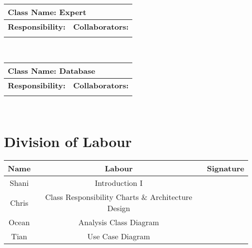 \documentclass[]{article}
\begin{document}
	\begin{table}[ht]
		\centering
		\begin{tabular}{|p{5cm}|p{5cm}|}
		\hline 
		 \multicolumn{2}{|l|}{\textbf{Class Name: Expert}} \\
		\hline
		\textbf{Responsibility:} & \textbf{Collaborators:} \\
		\hline
		\vspace{1in} & \\
		\hline
		\end{tabular}
	\end{table}~\\

	\begin{table}[ht]
		\centering
		\begin{tabular}{|p{5cm}|p{5cm}|}
		\hline 
		 \multicolumn{2}{|l|}{\textbf{Class Name: Database}} \\
		\hline
		\textbf{Responsibility:} & \textbf{Collaborators:} \\
		\hline
		\vspace{1in} & \\
		\hline
		\end{tabular}
	\end{table}~\\

\appendix
\section{Division of Labour}
\label{sec:division_of_labour}
\begin{center}
\begin{tabular}{ |c|c|c| } 
 \hline
 Name & Labour & Signature              \\ \hline
 Shani & Introduction I & \\ 
 Chris & Class Responsibility Charts \& Architecture Design &  \\
 Ocean & Analysis Class Diagram &  \\ 
 Tian & Use Case Diagram & \\ 
 \hline
\end{tabular}
\end{center}

\newpage
\end{document}
